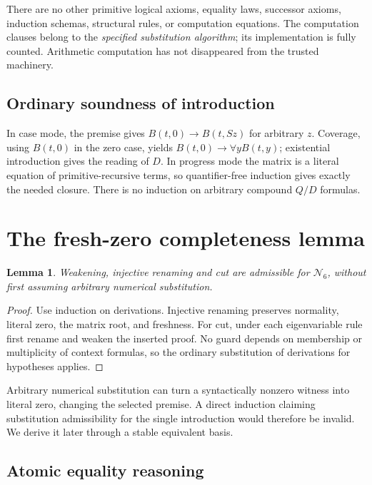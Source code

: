 \documentclass[11pt]{article}
\newtheorem{lemma}[theorem]{Lemma}
\theoremstyle{definition}
\newcommand{\Six}{\ensuremath{\mathcal N_6}}
\begin{document}
There are no other primitive logical axioms, equality laws, successor
axioms, induction schemas, structural rules, or computation equations.
The computation clauses belong to the \emph{specified substitution
algorithm}; its implementation is fully counted. Arithmetic computation
has not disappeared from the trusted machinery.

\subsection{Ordinary soundness of introduction}

In case mode, the premise gives $B(t,0)\to B(t,Sz)$ for arbitrary $z$.
Coverage, using $B(t,0)$ in the zero case, yields
$B(t,0)\to\forall yB(t,y)$; existential introduction gives the reading
of $D$. In progress mode the matrix is a literal equation of
primitive-recursive terms, so quantifier-free induction gives exactly
the needed closure. There is no induction on arbitrary compound
$Q/D$ formulas.

\section{The fresh-zero completeness lemma}
\label{sec:freshzero}

\begin{lemma}
Weakening, injective renaming and cut are admissible for \Six,
without first assuming arbitrary numerical substitution.
\end{lemma}

\begin{proof}
Use induction on derivations. Injective renaming preserves normality,
literal zero, the matrix root, and freshness. For cut, under each
eigenvariable rule first rename and weaken the inserted proof.
No guard depends on membership or multiplicity of context formulas,
so the ordinary substitution of derivations for hypotheses applies.
\end{proof}

Arbitrary numerical substitution can turn a syntactically nonzero
witness into literal zero, changing the selected premise. A direct
induction claiming substitution admissibility for the single
introduction would therefore be invalid. We derive it later through
a stable equivalent basis.

\subsection{Atomic equality reasoning}
\end{document}
